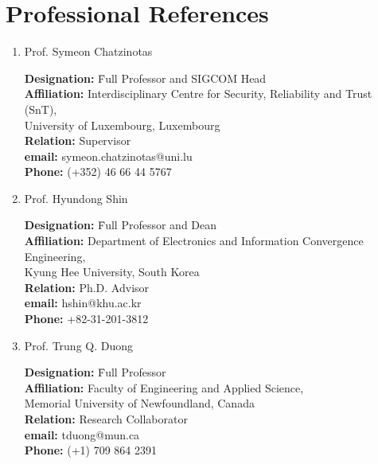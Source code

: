 \documentclass[10pt]{article}
\begin{document}
\section*{Professional References}
\begin{enumerate}
	
    \item[1.] Prof. Symeon Chatzinotas\\[-0.8cm]
\begin{tabbing}
    \textbf{Designation:} \= Full Professor and SIGCOM Head\\
    \textbf{Affiliation:} \> Interdisciplinary Centre for Security, Reliability and Trust (SnT), \\
        \> University of Luxembourg, Luxembourg\\
    \textbf{Relation:} \> Supervisor\\
    \textbf{email:} \> symeon.chatzinotas@uni.lu\\
    \textbf{Phone:} \> (+352) 46 66 44 5767
\end{tabbing}

	
	\item[2.] Prof. Hyundong Shin\\[-0.8cm]
	\begin{tabbing}
		\textbf{Designation:} \= Full Professor and Dean\\
		\textbf{Affiliation:} \> Department of Electronics and Information Convergence Engineering, \\
            \>  Kyung Hee University, South Korea\\
		\textbf{Relation:} \> Ph.D. Advisor\\
		\textbf{email:} \> hshin@khu.ac.kr\\
		\textbf{Phone:} \> +82-31-201-3812
	\end{tabbing}

 	\item[3.] Prof. Trung Q. Duong \\[-0.8cm]
	\begin{tabbing}
		\textbf{Designation:} \= Full Professor\\
		\textbf{Affiliation:} \> Faculty of Engineering and Applied Science, \\
		\>  Memorial University of Newfoundland, Canada\\
		\textbf{Relation:} \> Research Collaborator\\
		\textbf{email:} \> tduong@mun.ca\\
		\textbf{Phone:} \> (+1) 709 864 2391
	\end{tabbing}
 


\end{enumerate}
\end{document}
